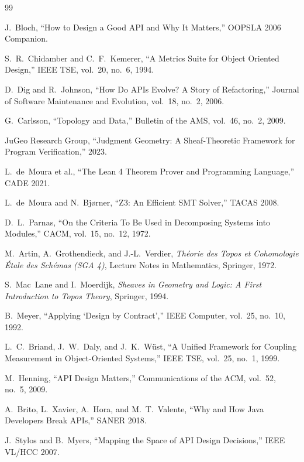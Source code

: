 \documentclass[11pt]{article}
\begin{document}
\begin{thebibliography}{99}

J.~Bloch, ``How to Design a Good API and Why It Matters,'' OOPSLA 2006
Companion.

S.~R.~Chidamber and C.~F.~Kemerer, ``A Metrics Suite for Object Oriented
Design,'' IEEE TSE, vol.~20, no.~6, 1994.

D.~Dig and R.~Johnson, ``How Do APIs Evolve? A Story of Refactoring,''
Journal of Software Maintenance and Evolution, vol.~18, no.~2, 2006.

G.~Carlsson, ``Topology and Data,'' Bulletin of the AMS, vol.~46, no.~2,
2009.

JuGeo Research Group, ``Judgment Geometry: A Sheaf-Theoretic Framework for
Program Verification,'' 2023.

L.~de~Moura et al., ``The Lean 4 Theorem Prover and Programming Language,''
CADE 2021.

L.~de~Moura and N.~Bj{\o}rner, ``Z3: An Efficient SMT Solver,'' TACAS 2008.

D.~L.~Parnas, ``On the Criteria To Be Used in Decomposing Systems into
Modules,'' CACM, vol.~15, no.~12, 1972.

M.~Artin, A.~Grothendieck, and J.-L.~Verdier, \emph{Th{\'e}orie des Topos
et Cohomologie {\'E}tale des Sch{\'e}mas (SGA 4)}, Lecture Notes in
Mathematics, Springer, 1972.

S.~Mac~Lane and I.~Moerdijk, \emph{Sheaves in Geometry and Logic: A First
Introduction to Topos Theory}, Springer, 1994.

B.~Meyer, ``Applying `Design by Contract','' IEEE Computer, vol.~25,
no.~10, 1992.

L.~C.~Briand, J.~W.~Daly, and J.~K.~W{\"u}st, ``A Unified Framework for
Coupling Measurement in Object-Oriented Systems,'' IEEE TSE, vol.~25,
no.~1, 1999.

M.~Henning, ``API Design Matters,'' Communications of the ACM, vol.~52,
no.~5, 2009.

A.~Brito, L.~Xavier, A.~Hora, and M.~T.~Valente, ``Why and How Java
Developers Break APIs,'' SANER 2018.

J.~Stylos and B.~Myers, ``Mapping the Space of API Design Decisions,''
IEEE VL/HCC 2007.


\end{thebibliography}
\end{document}
